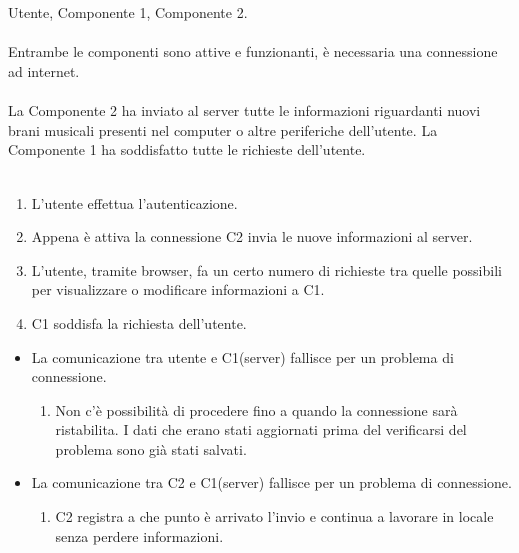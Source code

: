\newpage
\vspace*{0.5cm}
\\\\
 Utente, Componente 1, Componente 2. \\\\
 Entrambe le componenti sono attive e funzionanti, \`e
necessaria una connessione ad internet. \\\\ 
 La Componente 2 ha inviato al server tutte le
informazioni riguardanti nuovi brani musicali presenti nel computer o altre
periferiche dell'utente. La Componente 1 ha soddisfatto tutte le richieste
dell'utente. \\\\ 
\begin{enumerate}
  \item L'utente effettua l'autenticazione.
  \item Appena \`e attiva la connessione C2 invia le nuove informazioni al server.
  \item L'utente, tramite browser, fa un certo numero di richieste tra quelle
  possibili per visualizzare o modificare informazioni a C1.
  \item C1 soddisfa la richiesta dell'utente.
\end{enumerate}
\begin{itemize}
  \item La comunicazione tra utente e C1(server) fallisce per un problema di
  connessione.
  \begin {enumerate}
    \item Non c'\`e possibilit\`a di procedere fino a quando la connessione sar\`a
    ristabilita. I dati che erano stati aggiornati prima del verificarsi del
    problema sono gi\`a stati salvati.
  \end{enumerate}
  \item La comunicazione tra C2 e C1(server) fallisce per un problema di
  connessione.
  \begin {enumerate}
    \item C2 registra a che punto \`e arrivato l'invio e continua a lavorare in
    locale senza perdere informazioni.
  \end{enumerate}
\end{itemize}
\newpage


